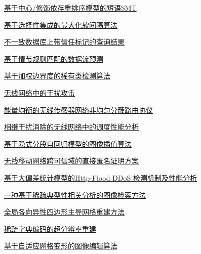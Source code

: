 \documentclass[a4paper]{article}
\begin{document}
\href{http://www.jos.org.cn/ch/reader/download_pdf.aspx?file_no=4055&year_id=2012&quarter_id=5&falg=1}{基于中心/修饰依存重排序模型的短语SMT}

\href{http://www.jos.org.cn/ch/reader/download_pdf.aspx?file_no=4064&year_id=2012&quarter_id=5&falg=1}{基于选择性集成的最大化软间隔算法}

\href{http://www.jos.org.cn/ch/reader/download_pdf.aspx?file_no=4079&year_id=2012&quarter_id=5&falg=1}{不一致数据库上带信任标记的查询结果}

\href{http://www.jos.org.cn/ch/reader/download_pdf.aspx?file_no=4094&year_id=2012&quarter_id=5&falg=1}{基于情节规则匹配的数据流预测}

\href{http://www.jos.org.cn/ch/reader/download_pdf.aspx?file_no=4104&year_id=2012&quarter_id=5&falg=1}{基于加权边界度的稀有类检测算法}

\href{http://www.jos.org.cn/ch/reader/download_pdf.aspx?file_no=4059&year_id=2012&quarter_id=5&falg=1}{无线网络中的干扰攻击}

\href{http://www.jos.org.cn/ch/reader/download_pdf.aspx?file_no=4061&year_id=2012&quarter_id=5&falg=1}{能量均衡的无线传感器网络非均匀分簇路由协议}

\href{http://www.jos.org.cn/ch/reader/download_pdf.aspx?file_no=4062&year_id=2012&quarter_id=5&falg=1}{相继干扰消除的无线网络中的调度性能分析}

\href{http://www.jos.org.cn/ch/reader/download_pdf.aspx?file_no=4049&year_id=2012&quarter_id=5&falg=1}{基于隐式分段自回归模型的图像插值算法}

\href{http://www.jos.org.cn/ch/reader/download_pdf.aspx?file_no=4052&year_id=2012&quarter_id=5&falg=1}{无线移动网络跨可信域的直接匿名证明方案}

\href{http://www.jos.org.cn/ch/reader/download_pdf.aspx?file_no=4068&year_id=2012&quarter_id=5&falg=1}{基于大偏差统计模型的Http-Flood DDoS 检测机制及性能分析}

\href{http://www.jos.org.cn/ch/reader/download_pdf.aspx?file_no=4032&year_id=2012&quarter_id=5&falg=1}{一种基于稀疏典型性相关分析的图像检索方法}

\href{http://www.jos.org.cn/ch/reader/download_pdf.aspx?file_no=3988&year_id=2012&quarter_id=5&falg=1}{全局各向异性四边形主导网格重建方法}

\href{http://www.jos.org.cn/ch/reader/download_pdf.aspx?file_no=3989&year_id=2012&quarter_id=5&falg=1}{稀疏字典编码的超分辨率重建}

\href{http://www.jos.org.cn/ch/reader/download_pdf.aspx?file_no=3998&year_id=2012&quarter_id=5&falg=1}{基于自适应网格变形的图像编辑算法}
\end{document}
